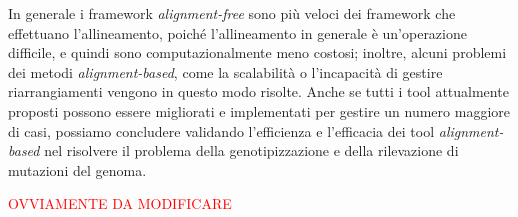 \documentclass[../main.tex]{subfiles}
\begin{document}
In generale i framework \textit{alignment-free} sono più veloci dei framework che effettuano l'allineamento, poiché l'allineamento in generale è un'operazione difficile, e quindi sono computazionalmente meno costosi; inoltre, alcuni problemi dei metodi \textit{alignment-based}, come la scalabilità o l'incapacità di gestire riarrangiamenti vengono in questo modo risolte. Anche se tutti i tool attualmente proposti possono essere migliorati e implementati per gestire un numero maggiore di casi, possiamo concludere validando l'efficienza e l'efficacia dei tool \textit{alignment-based} nel risolvere il problema della genotipizzazione e della rilevazione di mutazioni del genoma. 

\textcolor{red}{OVVIAMENTE DA MODIFICARE}
\end{document}
